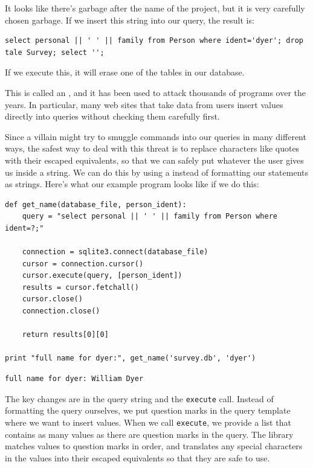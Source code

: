 \documentclass{book}
\begin{document}
It looks like there's garbage after the name of the project, but it is
very carefully chosen garbage. If we insert this string into our query,
the result is:

\begin{verbatim}
select personal || ' ' || family from Person where ident='dyer'; drop tale Survey; select '';
\end{verbatim}

If we execute this, it will erase one of the tables in our database.

This is called an , and it has been used to attack thousands of programs over the
years. In particular, many web sites that take data from users insert
values directly into queries without checking them carefully first.

Since a villain might try to smuggle commands into our queries in many
different ways, the safest way to deal with this threat is to replace
characters like quotes with their escaped equivalents, so that we can
safely put whatever the user gives us inside a string. We can do this by
using a  instead of
formatting our statements as strings. Here's what our example program
looks like if we do this:

\begin{verbatim}
def get_name(database_file, person_ident):
    query = "select personal || ' ' || family from Person where ident=?;"

    connection = sqlite3.connect(database_file)
    cursor = connection.cursor()
    cursor.execute(query, [person_ident])
    results = cursor.fetchall()
    cursor.close()
    connection.close()

    return results[0][0]

print "full name for dyer:", get_name('survey.db', 'dyer')
\end{verbatim}

\begin{verbatim}
full name for dyer: William Dyer
\end{verbatim}

The key changes are in the query string and the \texttt{execute} call.
Instead of formatting the query ourselves, we put question marks in the
query template where we want to insert values. When we call
\texttt{execute}, we provide a list that contains as many values as
there are question marks in the query. The library matches values to
question marks in order, and translates any special characters in the
values into their escaped equivalents so that they are safe to use.
\end{document}
